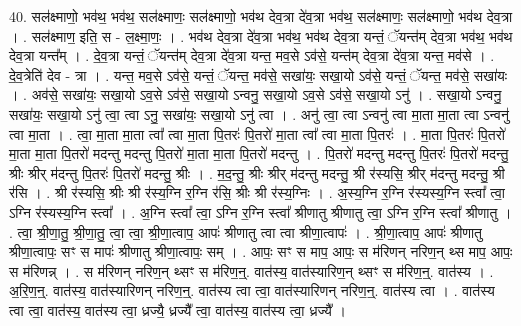 \documentclass[17pt]{extarticle}
\begin{document}
40. सल॑क्ष्माणो॒ भव॑थ॒ भव॑थ॒ सल॑क्ष्माणः॒ सल॑क्ष्माणो॒ भव॑थ देव॒त्रा दे॑व॒त्रा भव॑थ॒ सल॑क्ष्माणः॒ सल॑क्ष्माणो॒ भव॑थ देव॒त्रा । . सल॑क्ष्माण॒ इति॒ स - ल॒क्ष्मा॒णः॒ । . भव॑थ देव॒त्रा दे॑व॒त्रा भव॑थ॒ भव॑थ देव॒त्रा यन्तं॒ ॅयन्त॑म् देव॒त्रा भव॑थ॒ भव॑थ देव॒त्रा यन्त᳚म् । . दे॒व॒त्रा यन्तं॒ ॅयन्त॑म् देव॒त्रा दे॑व॒त्रा यन्त॒ मव॒से ऽव॑से॒ यन्त॑म् देव॒त्रा दे॑व॒त्रा यन्त॒ मव॑से । . दे॒व॒त्रेति॑ देव - त्रा । . यन्त॒ मव॒से ऽव॑से॒ यन्तं॒ ॅयन्त॒ मव॑से॒ सखा॑यः॒ सखा॒यो ऽव॑से॒ यन्तं॒ ॅयन्त॒ मव॑से॒ सखा॑यः । . अव॑से॒ सखा॑यः॒ सखा॒यो ऽव॒से ऽव॑से॒ सखा॒यो ऽन्वनु॒ सखा॒यो ऽव॒से ऽव॑से॒ सखा॒यो ऽनु॑ । . सखा॒यो ऽन्वनु॒ सखा॑यः॒ सखा॒यो ऽनु॑ त्वा॒ त्वा ऽनु॒ सखा॑यः॒ सखा॒यो ऽनु॑ त्वा । . अनु॑ त्वा॒ त्वा ऽन्वनु॑ त्वा मा॒ता मा॒ता त्वा ऽन्वनु॑ त्वा मा॒ता । . त्वा॒ मा॒ता मा॒ता त्वा᳚ त्वा मा॒ता पि॒तरः॑ पि॒तरो॑ मा॒ता त्वा᳚ त्वा मा॒ता पि॒तरः॑ । . मा॒ता पि॒तरः॑ पि॒तरो॑ मा॒ता मा॒ता पि॒तरो॑ मदन्तु मदन्तु पि॒तरो॑ मा॒ता मा॒ता पि॒तरो॑ मदन्तु । . पि॒तरो॑ मदन्तु मदन्तु पि॒तरः॑ पि॒तरो॑ मदन्तु॒ श्रीः श्रीर् म॑दन्तु पि॒तरः॑ पि॒तरो॑ मदन्तु॒ श्रीः । . म॒द॒न्तु॒ श्रीः श्रीर् म॑दन्तु मदन्तु॒ श्री र॑स्यसि॒ श्रीर् म॑दन्तु मदन्तु॒ श्री र॑सि । . श्री र॑स्यसि॒ श्रीः श्री र॑स्य॒ग्नि र॒ग्नि र॑सि॒ श्रीः श्री र॑स्य॒ग्निः । . अ॒स्य॒ग्नि र॒ग्नि र॑स्यस्य॒ग्नि स्त्वा᳚ त्वा॒ ऽग्नि र॑स्यस्य॒ग्नि स्त्वा᳚ । . अ॒ग्नि स्त्वा᳚ त्वा॒ ऽग्नि र॒ग्नि स्त्वा᳚ श्रीणातु श्रीणातु त्वा॒ ऽग्नि र॒ग्नि स्त्वा᳚ श्रीणातु । . त्वा॒ श्री॒णा॒तु॒ श्री॒णा॒तु॒ त्वा॒ त्वा॒ श्री॒णा॒त्वाप॒ आपः॑ श्रीणातु त्वा त्वा श्रीणा॒त्वापः॑ । . श्री॒णा॒त्वाप॒ आपः॑ श्रीणातु श्रीणा॒त्वापः॒ सꣳ स मापः॑ श्रीणातु श्रीणा॒त्वापः॒ सम् । . आपः॒ सꣳ स माप॒ आपः॒ स म॑रिणन् नरिण॒न् थ्स माप॒ आपः॒ स म॑रिणन्न् । . स म॑रिणन् नरिण॒न् थ्सꣳ स म॑रिण॒न्॒. वात॑स्य॒ वात॑स्यारिण॒न् थ्सꣳ स म॑रिण॒न्॒. वात॑स्य । . अ॒रि॒ण॒न्॒. वात॑स्य॒ वात॑स्यारिणन् नरिण॒न्॒. वात॑स्य त्वा त्वा॒ वात॑स्यारिणन् नरिण॒न्॒. वात॑स्य त्वा । . वात॑स्य त्वा त्वा॒ वात॑स्य॒ वात॑स्य त्वा॒ ध्रज्यै॒ ध्रज्यै᳚ त्वा॒ वात॑स्य॒ वात॑स्य त्वा॒ ध्रज्यै᳚ । \newline
\pagebreak
{}
\end{document}
